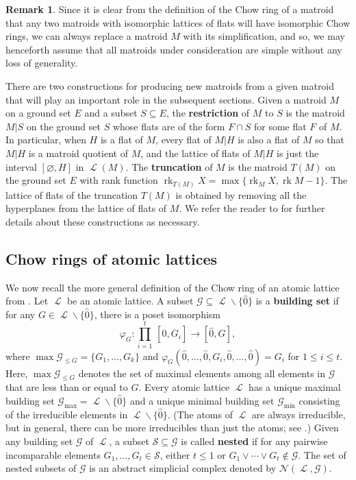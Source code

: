 \documentclass[11pt, reqno]{amsart}
\renewcommand{\emptyset}{\varnothing}
\renewcommand{\hat}[1]{\widehat{#1}}
\DeclareMathOperator{\LL}{\mathcal{L}}
\renewcommand{\phi}{\varphi}
\DeclareMathOperator{\rk}{rk}
\renewcommand{\setminus}{\smallsetminus}
\newcommand{\term}[1]{\textbf{\textsf{#1}}}
\theoremstyle{definition}
\newtheorem{rmk}[thm]{Remark}
\numberwithin{equation}{section}
\numberwithin{table}{section}
\begin{document}
\begin{spacing}{1.1}
\begin{rmk}
Since it is clear from the definition of the Chow ring of a matroid that any two matroids with isomorphic lattices of flats will have isomorphic Chow rings, we can always replace a matroid $M$ with its simplification, and so, we may henceforth assume that all matroids under consideration are simple without any loss of generality. 
\end{rmk}


There are two constructions for producing new matroids from a given matroid that will play an important role in the subsequent sections.  Given a matroid $M$ on a ground set $E$ and a subset $S \subseteq E$, the \term{restriction} of $M$ to $S$ is the matroid $M\vert S$ on the ground set $S$ whose flats are of the form $F \cap S$ for some flat $F$ of $M$.  In particular, when $H$ is a flat of $M$, every flat of $M\vert H$ is also a flat of $M$ so that $M \vert H$ is a matroid quotient of $M$, and the lattice of flats of $M\vert H$ is just the interval $[\emptyset, H]$ in $\LL(M)$.  The \term{truncation} of $M$ is the matroid $T(M)$ on the ground set $E$ with rank function $\rk_{T(M)} X = \max\{\rk_M X, \rk M - 1\}$.  The lattice of flats of the truncation $T(M)$ is obtained by removing all the hyperplanes from the lattice of flats of $M$.  We refer the reader to \cite{Oxl11} for further details about these constructions as necessary.


\subsection{Chow rings of atomic lattices}\label{SSachow}

We now recall the more general definition of the Chow ring of an atomic lattice from \cite{FY04}.  Let $\LL$ be an atomic lattice.  A subset $\mathcal{G} \subseteq \LL\smallsetminus\{\hat 0\}$ is a \term{building set} if for any $G \in \LL\smallsetminus \{\hat 0\}$, there is a poset isomorphism
\[\phi_G:\prod_{i = 1}^t \,[\hat0,G_i] \to [\hat0,G],\]
where $\max \mathcal{G}_{\leq G} =  \{G_1,\ldots,G_k\}$ and $\phi_G(\hat0,\ldots,\hat0,G_i,\hat0,\ldots,\hat0) = G_i$ for $1 \leq i \leq t$.  Here, $\max \mathcal{G}_{\leq G}$ denotes the set of maximal elements among all elements in $\mathcal{G}$ that are less than or equal to $G$.  Every atomic lattice $\LL$ has a unique maximal building set $\mathcal{G}_{\max} = \LL \smallsetminus \{\hat 0\}$ and a unique minimal building set $\mathcal{G}_{\min}$ consisting of the irreducible elements in $\LL \setminus \{\hat{0}\}$. (The atoms of $\LL$ are always irreducible, but in general, there can be more irreducibles than just the atoms; see \cite[Section~2]{incidence:combinatorics}.)  Given any building set $\mathcal{G}$ of $\LL$, a subset $\mathcal{S} \subseteq \mathcal{G}$ is called \term{nested} if for any pairwise incomparable elements $G_1,\ldots,G_t \in \mathcal{S}$, either $t \le 1$ or $G_1 \vee \cdots \vee G_t \notin \mathcal{G}$.  The set of nested subsets of $\mathcal{G}$ is an abstract simplicial complex denoted by $\mathcal{N}(\LL,\mathcal{G})$.  


\end{spacing}
\end{document}
